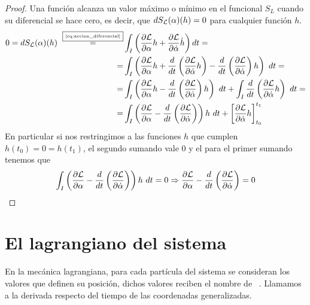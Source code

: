 \begin{proof}
	Una función alcanza un valor máximo o mínimo en el funcional $S_L$ cuando su diferencial se hace cero, es decir, que $dS_{\mathcal{L}}(\alpha)(h)=0$ para cualquier función $h$.
	\begin{equation*}
		\begin{split}
			0 = dS_{\mathcal{L}}(\alpha)(h)~\overset{\fbox{\tiny \ref{eq:accion_diferencial}}}{=}&\int_{I}\left( \frac{\partial \mathcal{L}}{\partial\alpha}h+\frac{\partial \mathcal{L}}{\partial\dot{\alpha}}\dot{h}\right) dt =\\
			= & \int_{I}\left( \frac{\partial \mathcal{L}}{\partial\alpha}h+\frac{d}{dt}\left( \frac{\partial \mathcal{L}}{\partial \dot{\alpha}}h \right)-\frac{d}{dt}\left( \frac{\partial \mathcal{L}}{\partial \dot{\alpha}} \right)h\right)\ dt = \\
			= & \int_{I}\left( \frac{\partial \mathcal{L}}{\partial \alpha}h-\frac{d}{dt}\left( \frac{\partial \mathcal{L}}{\partial \dot{\alpha}} \right)h\right)\ dt +\int_{I}\frac{d}{dt}\left( \frac{\partial \mathcal{L}}{\partial \dot{\alpha}}h \right)\ dt = \\
			= & \int_I\left( \frac{\partial \mathcal{L}}{\partial \alpha}-\frac{d}{dt}\left( \frac{\partial \mathcal{L}}{\partial \dot{\alpha}} \right)\right)h\ dt + \left[ \frac{\partial \mathcal{L}}{\partial \dot{\alpha}}h \right]_{t_0}^{t_1}
		\end{split}
	\end{equation*}
	En particular si nos restringimos a las funciones $h$ que cumplen $h(t_0)=0=h(t_1)$, el segundo sumando vale $0$ y el para el primer sumando tenemos que
	\begin{equation*}
		\int_{I}\left( \frac{\partial \mathcal{L}}{\partial \alpha}-\frac{d}{dt}\left( \frac{\partial \mathcal{L}}{\partial \dot{\alpha}} \right)\right)h\ dt = 0 \Rightarrow \frac{\partial \mathcal{L}}{\partial \alpha}-\frac{d}{dt}\left( \frac{\partial \mathcal{L}}{\partial \dot{\alpha}} \right) = 0
	\end{equation*}
\end{proof}
\section{El lagrangiano del sistema}\label{sec:el-lagrangiano-del-sistema}
En la mecánica lagrangiana, para cada partícula del sistema se consideran los valores que definen su posición, dichos valores reciben el nombre de ~\cite{GTP}.
Llamamos  a la derivada respecto del tiempo de las coordenadas generalizadas.

